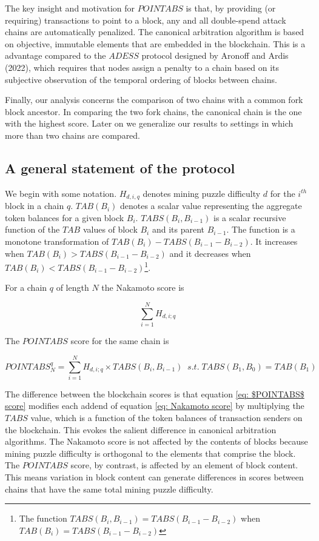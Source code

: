 \documentclass[11pt]{article}
\theoremstyle{plain}
\begin{document}
The key insight and motivation for $POINTABS$ is that, by providing (or requiring) transactions to point to a block, any and all double-spend attack chains are automatically penalized. The canonical arbitration algorithm is based on objective, immutable elements that are embedded in the blockchain. This is a advantage compared to the $ADESS$ protocol designed by Aronoff and Ardis (2022), which requires that nodes assign a penalty to a chain based on its subjective observation of the temporal ordering of blocks between chains. 

Finally, our analysis concerns the comparison of two chains with a common fork block ancestor. In comparing the two fork chains, the canonical chain is the one with the highest score. Later on we generalize our results to settings in which more than two chains are compared.

\subsection{\small{A general statement of the protocol}}

We begin with some notation. $H_{d,i,q}$ denotes mining puzzle difficulty $d$ for the $i^{th}$ block in a chain $q$. $TAB(B_{i})$ denotes a scalar value representing the aggregate token balances for a given block $B_{i}$. $TABS(B_{i}, B_{i-1})$ is a scalar recursive function of the $TAB$ values of block $B_{i}$ and its parent $B_{i-1}$. The function is a monotone transformation of $TAB(B_{i}) - TABS(B_{i-1} - B_{i-2})$. It increases when $TAB(B_{i}) > TABS(B_{i-1} - B_{i-2})$ and it decreases when $TAB(B_{i}) < TABS(B_{i-1} - B_{i-2})$\footnote{The function $TABS(B_{i}, B_{i-1}) = TABS(B_{i-1} - B_{i-2})$ when $TAB(B_{i}) = TABS(B_{i-1} - B_{i-2})$}.

For a chain $q$ of length $N$ the Nakamoto score is

\begin{equation}
\label{eq: Nakamoto score}
\sum_{i=1}^{N}H_{d,i;q}
\end{equation}

The $POINTABS$ score for the same chain is

\begin{equation}
\label{eq: $POINTABS$ score}
POINTABS_{N}^{q} = \sum_{i=1}^{N}H_{d,i;q}\times TABS(B_{i}, B_{i-1})\; \;s.t.\; TABS(B_{1}, B_{0}) = TAB(B_{1})
\end{equation}

The difference between the blockchain scores is that equation \ref{eq: $POINTABS$ score} modifies each addend of equation \ref{eq: Nakamoto score} by multiplying the $TABS$ value, which is a function of the token balances of transaction senders on the blockchain. This evokes the salient difference in canonical arbitration algorithms. The Nakamoto score is not affected by the contents of blocks because mining puzzle difficulty is orthogonal to the elements that comprise the block. The $POINTABS$ score, by contrast, is affected by an element of block content. This means variation in block content can generate differences in scores between chains that have the same total mining puzzle difficulty. 
\end{document}
